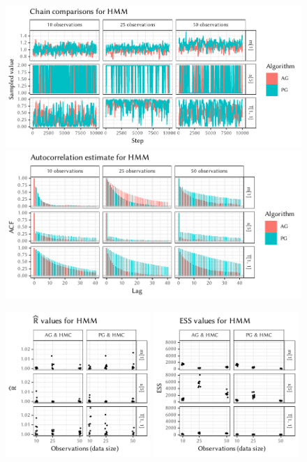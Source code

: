 \cleartorecto
\FloatBlock

\begin{figure}[p]
  \centering
  \includegraphics[width=\textwidth]{figures/HMM-chains}
  \par
  \includegraphics[width=\textwidth]{figures/HMM-acfs}
  \par
  \includegraphics[width=0.49\textwidth]{figures/HMM-rhat}
  \includegraphics[width=0.49\textwidth]{figures/HMM-ess}
\end{figure}

